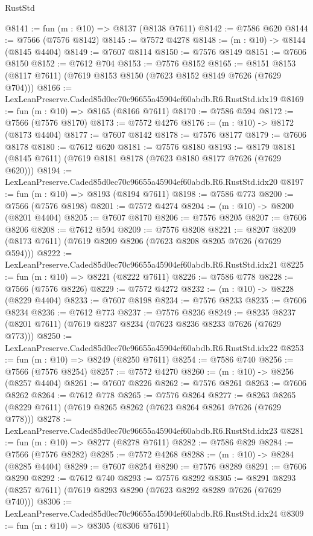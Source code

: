 \begin{lexlean}{RustStd}
\begin{coremodule}
@8141 := fun (m : @10) => @8137 (@8138 @7611)
@8142 := @7586 @620
@8144 := @7566 (@7576 @8142)
@8145 := @7572 @4278
@8148 := (m : @10) -> @8144 (@8145 @4404)
@8149 := @7607 @8114
@8150 := @7576 @8149
@8151 := @7606 @8150
@8152 := @7612 @704
@8153 := @7576 @8152
@8165 := @8151 @8153 (@8117 @7611) (@7619 @8153 @8150 (@7623 @8152 @8149 @7626 (@7629 @704)))
@8166 := LexLeanPreserve.Caded85d0ec70c96655a45904ef60abdb.R6.RustStd.idx19
@8169 := fun (m : @10) => @8165 (@8166 @7611)
@8170 := @7586 @594
@8172 := @7566 (@7576 @8170)
@8173 := @7572 @4276
@8176 := (m : @10) -> @8172 (@8173 @4404)
@8177 := @7607 @8142
@8178 := @7576 @8177
@8179 := @7606 @8178
@8180 := @7612 @620
@8181 := @7576 @8180
@8193 := @8179 @8181 (@8145 @7611) (@7619 @8181 @8178 (@7623 @8180 @8177 @7626 (@7629 @620)))
@8194 := LexLeanPreserve.Caded85d0ec70c96655a45904ef60abdb.R6.RustStd.idx20
@8197 := fun (m : @10) => @8193 (@8194 @7611)
@8198 := @7586 @773
@8200 := @7566 (@7576 @8198)
@8201 := @7572 @4274
@8204 := (m : @10) -> @8200 (@8201 @4404)
@8205 := @7607 @8170
@8206 := @7576 @8205
@8207 := @7606 @8206
@8208 := @7612 @594
@8209 := @7576 @8208
@8221 := @8207 @8209 (@8173 @7611) (@7619 @8209 @8206 (@7623 @8208 @8205 @7626 (@7629 @594)))
@8222 := LexLeanPreserve.Caded85d0ec70c96655a45904ef60abdb.R6.RustStd.idx21
@8225 := fun (m : @10) => @8221 (@8222 @7611)
@8226 := @7586 @778
@8228 := @7566 (@7576 @8226)
@8229 := @7572 @4272
@8232 := (m : @10) -> @8228 (@8229 @4404)
@8233 := @7607 @8198
@8234 := @7576 @8233
@8235 := @7606 @8234
@8236 := @7612 @773
@8237 := @7576 @8236
@8249 := @8235 @8237 (@8201 @7611) (@7619 @8237 @8234 (@7623 @8236 @8233 @7626 (@7629 @773)))
@8250 := LexLeanPreserve.Caded85d0ec70c96655a45904ef60abdb.R6.RustStd.idx22
@8253 := fun (m : @10) => @8249 (@8250 @7611)
@8254 := @7586 @740
@8256 := @7566 (@7576 @8254)
@8257 := @7572 @4270
@8260 := (m : @10) -> @8256 (@8257 @4404)
@8261 := @7607 @8226
@8262 := @7576 @8261
@8263 := @7606 @8262
@8264 := @7612 @778
@8265 := @7576 @8264
@8277 := @8263 @8265 (@8229 @7611) (@7619 @8265 @8262 (@7623 @8264 @8261 @7626 (@7629 @778)))
@8278 := LexLeanPreserve.Caded85d0ec70c96655a45904ef60abdb.R6.RustStd.idx23
@8281 := fun (m : @10) => @8277 (@8278 @7611)
@8282 := @7586 @829
@8284 := @7566 (@7576 @8282)
@8285 := @7572 @4268
@8288 := (m : @10) -> @8284 (@8285 @4404)
@8289 := @7607 @8254
@8290 := @7576 @8289
@8291 := @7606 @8290
@8292 := @7612 @740
@8293 := @7576 @8292
@8305 := @8291 @8293 (@8257 @7611) (@7619 @8293 @8290 (@7623 @8292 @8289 @7626 (@7629 @740)))
@8306 := LexLeanPreserve.Caded85d0ec70c96655a45904ef60abdb.R6.RustStd.idx24
@8309 := fun (m : @10) => @8305 (@8306 @7611)

\end{coremodule}
\end{lexlean}
